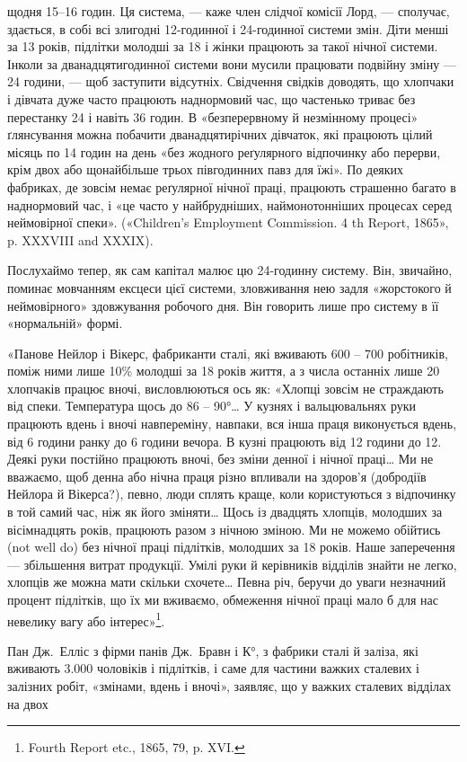{щодня 15--16 годин. Ця система, — каже член слідчої комісії Лорд, —
сполучає, здається, в собі всі злигодні 12-годинної і 24-годинної системи
змін. Діти менші за 13 років, підлітки молодші за 18 і жінки працюють
за такої нічної системи. Інколи за дванадцятигодинної системи вони
мусили працювати подвійну зміну — 24 години, — щоб заступити відсутніх.
Свідчення свідків доводять, що хлопчаки і дівчата дуже часто працюють
наднормовий час, що частенько триває без перестанку 24 і навіть 36 годин.
В «безперервному й незмінному процесі» ґлянсування можна побачити
дванадцятирічних дівчаток, які працюють цілий місяць по 14 годин на
день «без жодного реґулярного відпочинку або перерви, крім двох або
щонайбільше трьох півгодинних павз для їжі». По деяких фабриках, де
зовсім немає реґулярної нічної праці, працюють страшенно багато в наднормовий
час, і «це часто у найбрудніших, наймонотонніших процесах
серед неймовірної спеки». («Children’s Employment Commission. 4 th
Report, 1865», p. XXXVIII and XXXIX).
}

Послухаймо тепер, як сам капітал малює цю 24-годинну
систему. Він, звичайно, поминає мовчанням ексцеси цієї системи,
зловживання нею задля «жорстокого й неймовірного» здовжування
робочого дня. Він говорить лише про систему в її «нормальній»
формі.

«Панове Нейлор і Вікерс, фабриканти сталі, які вживають
600 – 700 робітників, поміж ними лише 10\% молодші за 18 років
життя, а з числа останніх лише 20 хлопчаків працює вночі,
висловлюються ось як: «Хлопці зовсім не страждають від спеки.
Температура щось до 86 – 90°\dots{} У кузнях і вальцювальнях
руки працюють вдень і вночі навпереміну, навпаки, вся інша
праця виконується вдень, від 6 години ранку до 6 години вечора.
В кузні працюють від 12 години до 12. Деякі руки постійно працюють
вночі, без зміни денної і нічної праці\dots{} Ми не вважаємо,
щоб денна або нічна праця різно впливали на здоров’я (добродіїв
Нейлора й Вікерса?), певно, люди сплять краще, коли користуються
з відпочинку в той самий час, ніж як його зміняти\dots{}
Щось із двадцять хлопців, молодших за вісімнадцять років,
працюють разом з нічною зміною. Ми не можемо обійтись (not
well do) без нічної праці підлітків, молодших за 18 років. Наше
заперечення — збільшення витрат продукції. Умілі руки й
керівників відділів знайти не легко, хлопців же можна мати
скільки схочете\dots{} Певна річ, беручи до уваги незначний процент
підлітків, що їх ми вживаємо, обмеження нічної праці мало б
для нас невелику вагу або інтерес»\footnote{
Fourth Report etc., 1865, 79, p. XVI.
}.

Пан Дж.~Елліс з фірми панів Дж.~Бравн і К°, з фабрики
сталі й заліза, які вживають \num{3.000} чоловіків і підлітків,
і саме для частини важких сталевих і залізних робіт, «змінами,
вдень і вночі», заявляє, що у важких сталевих відділах на двох
\parbreak{}  %
